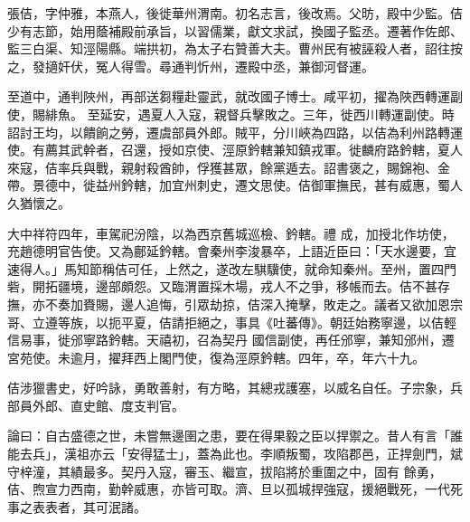 \begin{pinyinscope}
 張佶，字仲雅，本燕人，後徙華州渭南。初名志言，後改焉。父昉，殿中少監。佶少有志節，始用蔭補殿前承旨，以習儒業，獻文求試，換國子監丞。遷著作佐郎、監三白渠、知涇陽縣。端拱初，為太子右贊善大夫。曹州民有被誣殺人者，詔往按之，發擿奸伏，冤人得雪。尋通判忻州，遷殿中丞，兼御河督運。



 至道中，通判陜州，再部送芻糧赴靈武，就改國子博士。咸平初，擢為陜西轉運副使，賜緋魚。
 至延安，遇夏人入寇，親督兵擊敗之。三年，徙西川轉運副使。時詔討王均，以饋餉之勞，遷虞部員外郎。賊平，分川峽為四路，以佶為利州路轉運使。有薦其武幹者，召還，授如京使、涇原鈐轄兼知鎮戎軍。徙麟府路鈐轄，夏人來寇，佶率兵與戰，親射殺酋帥，俘獲甚眾，餘黨遁去。詔書褒之，賜錦袍、金帶。景德中，徙益州鈐轄，加宜州刺史，遷文思使。佶御軍撫民，甚有威惠，蜀人久猶懷之。



 大中祥符四年，車駕祀汾陰，以為西京舊城巡檢、鈐轄。禮
 成，加授北作坊使，充趙德明官告使。又為鄜延鈐轄。會秦州李浚暴卒，上語近臣曰：「天水邊要，宜速得人。」馬知節稱佶可任，上然之，遂改左騏驥使，就命知秦州。至州，置四門砦，開拓疆境，邊部頗怨。又臨渭置採木場，戎人不之爭，移帳而去。佶不甚存撫，亦不奏加賚賜，邊人追悔，引眾劫掠，佶深入掩擊，敗走之。議者又欲加恩宗哥、立遵等族，以扼平夏，佶請拒絕之，事具《吐蕃傳》。朝廷始務寧邊，以佶輕信易事，徙邠寧路鈐轄。天禧初，召為契丹
 國信副使，再任邠寧，兼知邠州，遷宮苑使。未逾月，擢拜西上閣門使，復為涇原鈐轄。四年，卒，年六十九。



 佶涉獵書史，好吟詠，勇敢善射，有方略，其總戎護塞，以威名自任。子宗象，兵部員外郎、直史館、度支判官。



 論曰：自古盛德之世，未嘗無邊圉之患，要在得果毅之臣以捍禦之。昔人有言「誰能去兵」，漢祖亦云「安得猛士」，蓋為此也。李順叛蜀，攻陷郡邑，正捍劍門，斌守梓潼，其績最多。契丹入寇，審玉、繼宣，拔陷將於重圍之中，固有
 餘勇，佶、煦宣力西南，勤幹威惠，亦皆可取。濟、旦以孤城捍強寇，援絕戰死，一代死事之表表者，其可泯諸。



\end{pinyinscope}